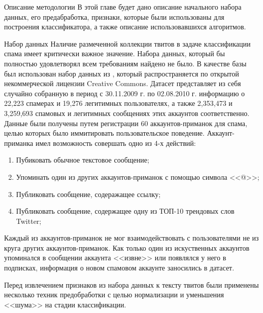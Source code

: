 

\begin{section}{Описание методологии}
   В этой главе будет дано описание начального набора данных,
   его предабработка, признаки, которые были использованы для построения классификатора, а также описание использовавшихся алгоритмов.
  \begin{subsection}{Набор данных}
    \label{sec:dataset}
    Наличие размеченной коллекции твитов в задаче классификации
    спама имеет критически важное значение.
    Набора данных, который бы полностью удовлетворял всем требованиям найдено не было.
    В качестве базы был использован набор данных из \cite{Lee}, который распространяется
    по открытой некоммерческой лицензии Creative Commons.
    Датасет представляет из себя случайно собранную в период с 30.11.2009 г. по 02.08.2010 г. информацию
    о 22,223 спамерах и 19,276 легитимных пользователях, а также 2,353,473 и 3,259,693
    спамовых и легитимных сообщениях этих аккаунтов соответственно.
    Данные были получены путем регистрации 60 аккаунтов-приманок для спама, целью которых
    было иммитировать пользовательское поведение.
    Аккаунт-приманка имел возможность совершать одно из 4-х действий:
    \begin{enumerate}
      \item Пубиковать обычное текстовое сообщение;
      \item Упоминать один из других аккаунтов-приманок с помощью символа <<@>>;
      \item Публиковать сообщение, содеражащее ссылку;
      \item Публиковать сообщение, содержащее одну из ТОП-10 трендовых слов Twitter;
    \end{enumerate}

    Каждый из аккаунтов-приманок не мог взаимодействовать
    с пользователями не из круга других аккаунтов-приманок. Как только один из искуственных аккаунтов упоминался в сообщении аккаунта <<извне>> или появлялся у него в подписках, информация о новом спамовом аккаунте заносились в датасет.

    Перед извлечением признаков из набора данных к тексту твитов были применены несколько техник предобработки с целью нормализации и уменьшения <<шума>> на стадии классификации.

  \end{subsection}



\end{section}
